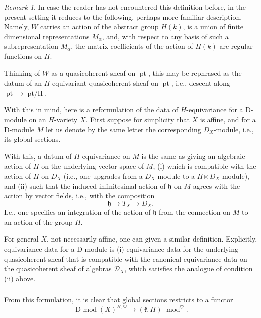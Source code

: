 \documentclass[10pt]{amsart}
\newcommand{\fh}{\mathfrak{h}}
\newcommand{\on}{\operatorname}
\renewcommand{\mod}{\on{-mod}}
\newcommand{\Dmod}{\on{D-mod}}
\theoremstyle{remark}
\newtheorem{re}[subsubsection]{Remark}
\newcommand{\fk}{\mathfrak{k}}
\newcommand{\sD}{\mathscr{D}}
\numberwithin{equation}{section}
\renewcommand{\mod}{\operatorname{-mod}}
\begin{document}
	
	\begin{re}In case the reader has not encountered this definition before, in the present setting it reduces to the following, perhaps more familiar description. Namely, $W$ carries an action of the abstract group $H(k)$, is a union of finite dimensional representations $M_\alpha$, and, with respect to any basis of such a subrepresentation $M_\alpha$, the matrix coefficients of the action of $H(k)$ are regular functions on $H$. 
	\end{re}
	

	
	Thinking of $W$ as a 
	quasicoherent sheaf on $\on{pt}$, this may be rephrased as the datum of an 
	$H$-equivariant quasicoherent sheaf on $\on{pt}$, i.e., descent along 
	$\on{pt} \rightarrow \on{pt/H}$.  
	
		
	
	With this in mind, here is a reformulation of the data of 
	$H$-equivariance for a D-module on an $H$-variety $X$. First suppose for 
	simplicity that 
	$X$ is affine, and 
	for a D-module $M$ let us denote by the same letter the corresponding 
	$D_X$-module, i.e., its global sections.
	
	With this, a datum of $H$-equivariance 
	on $M$ is the same as 
	giving an algebraic action of $H$ on the underlying vector space of $M$, (i) 
	which 
	is compatible with the action of $H$ on $D_X$ (i.e., one upgrades from 
	a 
	$D_X$-module to a $H \ltimes D_X$-module), and (ii) such that the induced 
	infinitesimal 
	action of $\fh$ on $M$ agrees with the action by vector fields, i.e., with the 
	composition
	\begin{equation} \label{e:hch}
	\fh \rightarrow T_X \rightarrow D_X. 
	\end{equation}
	I.e., one specifies an integration of the action of $\fh$ from the 
	connection 
	on $M$ to an action of the group $H$.
	
	For general $X$, not necessarily affine, 
	one can given a similar definition. Explicitly, equivariance data for a 
	D-module is 
	(i) equivariance data for the underlying quasicoherent sheaf that is compatible 
	with 
	the canonical equivariance data on the quasicoherent sheaf of algebras 
	$\sD_X$, 
	which satisfies the analogue of condition (ii) above. 
	
	\subsubsection{} From this formulation, it is clear that global sections 
	restricts to a 
     functor 
     \[
         \Dmod(X)^{H, \heartsuit} \rightarrow (\fk, H)\mod^\heartsuit. 
     \]
	
\end{document}
